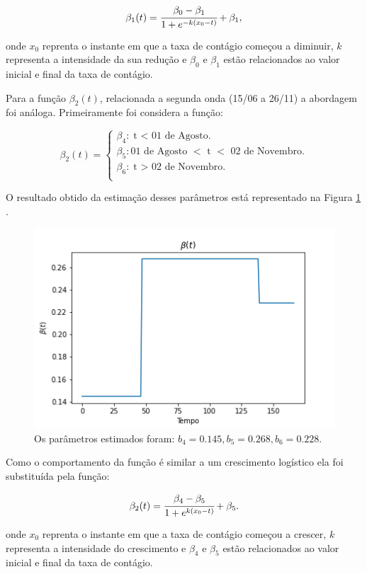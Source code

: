 \documentclass[12pt]{article}
\begin{document}
$$\beta_1(t) = \cfrac{\beta_0 - \beta_1}{1 + e^{-k(x_0 - t)}} + \beta_1, $$

\noindent onde $x_0$ reprenta o instante em que a taxa de contágio começou a diminuir, $k$ representa a intensidade da sua redução e $\beta_0$ e $\beta_1$ estão relacionados ao valor inicial e final da taxa de contágio. 

Para a função $\beta_2(t)$, relacionada a segunda onda (15/06 a 26/11) a abordagem foi análoga. Primeiramente foi considera a função:

$$ \beta_2(t) =
\begin{cases}
\beta_4 : \text{t $<$ 01 de Agosto.} \\
\beta_5 : \text{01 de Agosto $<$ t $<$ 02 de Novembro.}\\
\beta_6 : \text{t $>$ 02 de Novembro.} \\
\end{cases}$$


\noindent O resultado obtido da estimação desses parâmetros está representado na Figura \ref{beta2teste} . 

\begin{figure}[h!]
    \centering
    \includegraphics[scale = 0.6]{beta2_teste.png}
    \caption{Os parâmetros estimados foram: $b_4 = 0.145, b_5 = 0.268, b_6= 0.228. $}
    \label{beta2teste}
\end{figure}

Como o comportamento da função é similar a um crescimento logístico ela foi substituída pela função: 

$$\beta_2(t) = \cfrac{\beta_4 - \beta_5}{1 + e^{k(x_0 - t)}} + \beta_5. $$

\noindent onde $x_0$ reprenta o instante em que a taxa de contágio começou a crescer, $k$ representa a intensidade do crescimento e $\beta_4$ e $\beta_5$ estão relacionados ao valor inicial e final da taxa de contágio. 
\end{document}
